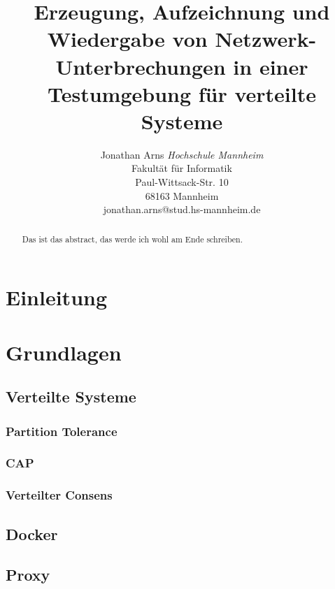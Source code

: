 \documentclass[a4paper]{report}
\begin{document}
\title{Erzeugung, Aufzeichnung und Wiedergabe von Netzwerk-Unterbrechungen in einer Testumgebung für verteilte Systeme}


\author{Jonathan Arns
	\textit{Hochschule Mannheim} \\
	Fakultät für Informatik\\
	Paul-Wittsack-Str. 10\\
	68163 Mannheim\\
	jonathan.arns@stud.hs-mannheim.de
}

\maketitle

\tableofcontents


\begin{abstract}
	Das ist das abstract, das werde ich wohl am Ende schreiben.
\end{abstract}


\chapter{Einleitung}

\chapter{Grundlagen}
\section{Verteilte Systeme}
\subsection{Partition Tolerance}
\subsection{CAP}
\subsection{Verteilter Consens}
\section{Docker}
\section{Proxy}
\end{document}

